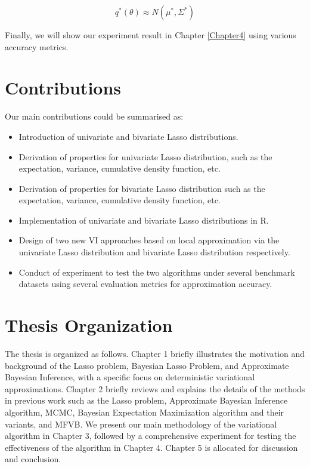 \begin{equation}
	\label{eq:GV}
	q^{*}(\theta) \approx N(\mu^*,\Sigma^*)
\end{equation}

\noindent 
Finally, we will show our experiment result in Chapter \ref{Chapter4} using various accuracy metrics.

\section{Contributions}
\label{cont}
Our main contributions could be summarised as:
\begin{itemize}
	\item Introduction of univariate and bivariate Lasso distributions.
 
	\item Derivation of properties for univariate Lasso distribution, such as the expectation, variance, cumulative density function, etc.
 
	\item Derivation of properties for bivariate Lasso distribution such as the expectation, variance, cumulative density function, etc.
 
	\item Implementation of univariate and bivariate Lasso distributions in R.
 
	\item Design of two new VI approaches based on local approximation via the univariate Lasso distribution and bivariate Lasso distribution respectively.
 
	\item Conduct of experiment to test the two algorithms under
 several benchmark datasets using several evaluation metrics for approximation accuracy.
\end{itemize}



\section{Thesis Organization}
The thesis is organized as follows. Chapter 1 briefly illustrates the motivation and background of the Lasso problem, Bayesian Lasso Problem, and Approximate Bayesian Inference, with a specific focus on deterministic variational approximations. Chapter 2  briefly reviews and explains the details of the methods in previous work such as the Lasso problem, Approximate Bayesian Inference algorithm, MCMC, Bayesian Expectation Maximization algorithm and their variants, and MFVB. We present our main methodology of the variational algorithm in Chapter 3, followed by a comprehensive experiment for testing the effectiveness of the algorithm in Chapter 4. Chapter 5 is allocated for discussion and conclusion. 



